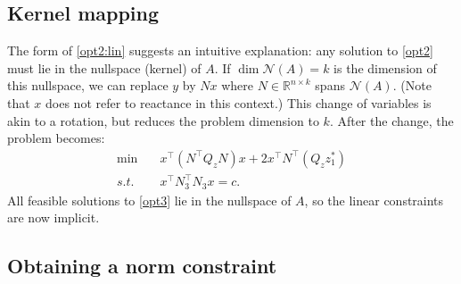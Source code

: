 \documentclass[conference]{IEEEtran}
\begin{document}
\subsection{Kernel mapping}

The form of \eqref{opt2:lin} suggests an intuitive explanation: any
solution to \eqref{opt2} must lie in the nullspace (kernel) of $A$. If
$\dim \mathcal{N}(A) =k$ is the dimension of this nullspace, we can
replace $y$ by $Nx$ where $N\in\mathbb{R}^{n\times k}$ spans
$\mathcal{N}(A)$. (Note that $x$ does not refer to reactance in this
context.) This change of variables is akin to a rotation, but reduces
the problem dimension to $k$. After the change, the problem becomes:
\begin{subequations}\label{opt3}
\begin{align}
\label{opt3:obj} \min\quad  &x^\top (N^\top Q_zN) x + 2x^\top N^\top(Q_zz_1^*) \\
\label{opt3:quad} s.t.\quad &x^\top N_3^\top N_3 x = c.
\end{align}
\end{subequations}
All feasible solutions to \eqref{opt3} lie in the nullspace of $A$, so
the linear constraints are now implicit.

\subsection{Obtaining a norm constraint}
\end{document}
